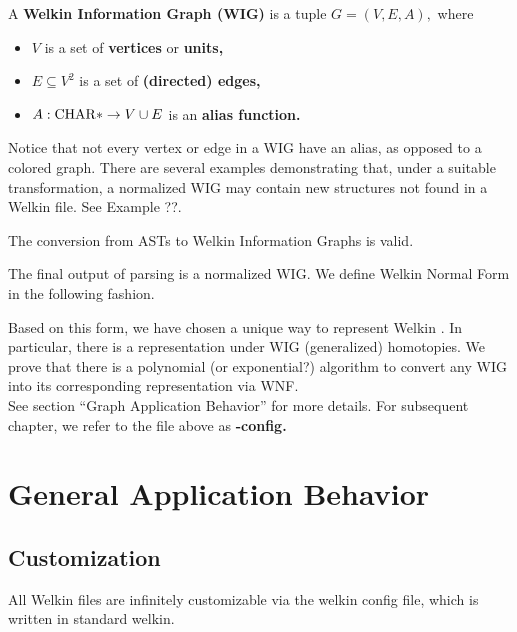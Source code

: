 \begin{definition}
	A \textbf{Welkin Information Graph (WIG)} is a tuple $G = (V, E, A),$ where
	\begin{itemize}
		\item $V$ is a set of \textbf{vertices} or \textbf{units,}
		\item $E \subseteq V^{2} $ is a set of \textbf{(directed) edges,}
		\item $A: \mathrm{CHAR}* \to V \cup E$ is an \textbf{alias function.}
	\end{itemize}
  \end{definition}
  Notice that not every vertex or edge in a WIG have an alias, as opposed to a colored graph. There are several examples demonstrating that, under a suitable transformation, a normalized WIG may contain new structures not found in a Welkin file. See Example ??.
\begin{lemma}
The conversion from ASTs to Welkin Information Graphs is valid.
\end{lemma}
The final output of parsing is a normalized WIG. We define Welkin Normal Form in the following fashion.


Based on this form, we have chosen a unique way to represent Welkin . In particular, there is a representation under WIG (generalized) homotopies. We prove that there is a polynomial (or exponential?) algorithm to convert any WIG into its corresponding representation via WNF.
\\ See section ``Graph Application Behavior'' for more details. For subsequent chapter, we refer to the file above as \textbf{-config.}


\section{General Application Behavior}


\subsection{Customization}
All Welkin files are infinitely customizable via the welkin config file, which is written in standard welkin.

